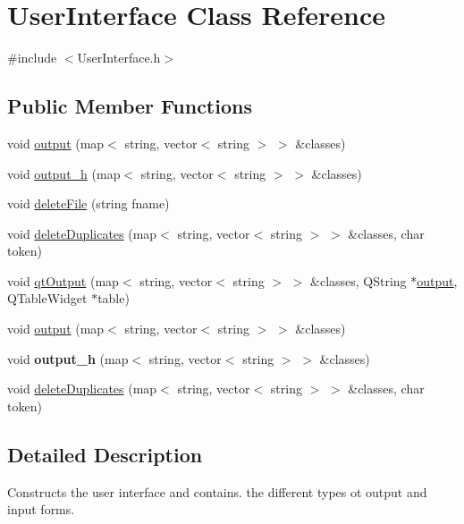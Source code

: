 \hypertarget{class_user_interface}{\section{User\-Interface Class Reference}
\label{class_user_interface}
}


{\ttfamily \#include $<$User\-Interface.\-h$>$}

\subsection*{Public Member Functions}
\begin{DoxyCompactItemize}
\item 
void \hyperlink{class_user_interface_a8ed960186e9c41fd8367b3d71da546f8}{output} (map$<$ string, vector$<$ string $>$ $>$ \&classes)
\item 
void \hyperlink{class_user_interface_ad27a5035bcd5d32eaf2ca870e8ab10a7}{output\-\_\-h} (map$<$ string, vector$<$ string $>$ $>$ \&classes)
\item 
void \hyperlink{class_user_interface_a62000ec96ec57056f5b6e6a6fcbfc719}{delete\-File} (string fname)
\item 
void \hyperlink{class_user_interface_afb94642309072d3927dac399afd744c2}{delete\-Duplicates} (map$<$ string, vector$<$ string $>$ $>$ \&classes, char token)
\item 
void \hyperlink{class_user_interface_aec96db5035550670c88f077d36b7ef24}{qt\-Output} (map$<$ string, vector$<$ string $>$ $>$ \&classes, Q\-String $\ast$\hyperlink{class_user_interface_a8ed960186e9c41fd8367b3d71da546f8}{output}, Q\-Table\-Widget $\ast$table)
\item 
void \hyperlink{class_user_interface_a8ed960186e9c41fd8367b3d71da546f8}{output} (map$<$ string, vector$<$ string $>$ $>$ \&classes)
\item 
\hypertarget{class_user_interface_ad27a5035bcd5d32eaf2ca870e8ab10a7}{void {\bfseries output\-\_\-h} (map$<$ string, vector$<$ string $>$ $>$ \&classes)}\label{class_user_interface_ad27a5035bcd5d32eaf2ca870e8ab10a7}

\item 
void \hyperlink{class_user_interface_afb94642309072d3927dac399afd744c2}{delete\-Duplicates} (map$<$ string, vector$<$ string $>$ $>$ \&classes, char token)
\end{DoxyCompactItemize}


\subsection{Detailed Description}
Constructs the user interface and contains. the different types ot output and input forms. 


